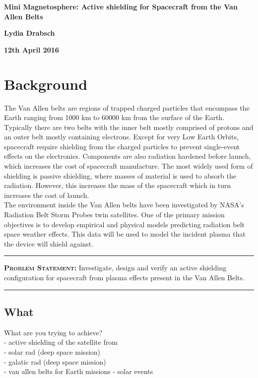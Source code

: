 \documentclass[12pt,a4paper]{article}
\begin{document}
{\centering\bf\LARGE\color{titlecolour} Mini Magnetosphere: Active shielding for Spacecraft from the Van Allen Belts    \par} %
{\centering\bf Lydia Drabsch\par}
{\bf\centering 12th April 2016\par}



\section*{Background}
The Van Allen belts are regions of trapped charged particles that encompass the Earth ranging from 1000 km to 60000 km from the surface of the Earth. Typically there are two belts with the inner belt mostly comprised of protons and an outer belt mostly containing electrons. Except for very Low Earth Orbits, spacecraft require shielding from the charged particles to prevent single-event effects on the electronics. Components are also radiation hardened before launch, which increases the cost of spacecraft manufacture. The most widely used form of shielding is passive shielding, where masses of material is used to absorb the radiation. However, this increases the mass of the spacecraft which in turn increases the cost of launch.\\

The environment inside the Van Allen belts have been investigated by NASA's Radiation Belt Storm Probes twin satellites. One of the primary mission objectives is to develop empirical and physical models predicting radiation belt space weather effects. This data will be used to model the incident plasma that the device will shield against.

\vspace{12pt}
\hrule
\vspace{3mm}
\noindent\textbf{\scshape\Large\color{scolour}Problem Statement:} Investigate, design and verify an active shielding configuration for spacecraft from plasma effects present in the Van Allen Belts. 
\vspace{3mm}
\hrule


\subsection{What}
What are you trying to achieve?\\
- active shielding of the satellite from\\
\indent - solar rad (deep space mission)\\
\indent - galatic rad (deep space mission)\\
\indent - van allen belts for Earth missions - solar events\\
\end{document}
